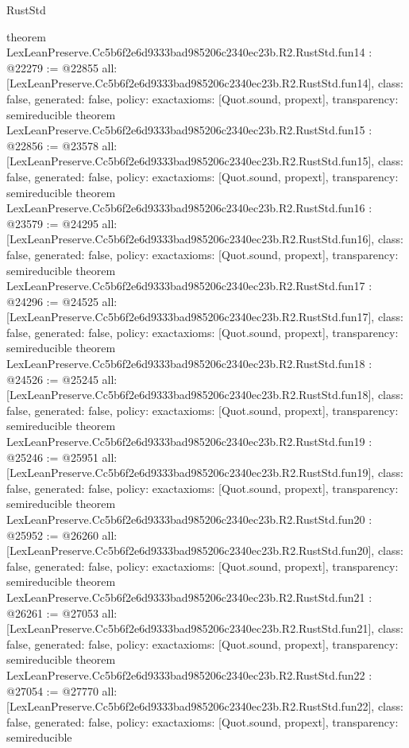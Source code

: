 \begin{lexlean}{RustStd}
\begin{coremodule}
{}
theorem LexLeanPreserve.Cc5b6f2e6d9333bad985206c2340ec23b.R2.RustStd.fun14 : @22279 := @22855 {
  all: [LexLeanPreserve.Cc5b6f2e6d9333bad985206c2340ec23b.R2.RustStd.fun14],
  class: false,
  generated: false,
  policy: exact{axioms: [Quot.sound, propext]},
  transparency: semireducible
}
theorem LexLeanPreserve.Cc5b6f2e6d9333bad985206c2340ec23b.R2.RustStd.fun15 : @22856 := @23578 {
  all: [LexLeanPreserve.Cc5b6f2e6d9333bad985206c2340ec23b.R2.RustStd.fun15],
  class: false,
  generated: false,
  policy: exact{axioms: [Quot.sound, propext]},
  transparency: semireducible
}
theorem LexLeanPreserve.Cc5b6f2e6d9333bad985206c2340ec23b.R2.RustStd.fun16 : @23579 := @24295 {
  all: [LexLeanPreserve.Cc5b6f2e6d9333bad985206c2340ec23b.R2.RustStd.fun16],
  class: false,
  generated: false,
  policy: exact{axioms: [Quot.sound, propext]},
  transparency: semireducible
}
theorem LexLeanPreserve.Cc5b6f2e6d9333bad985206c2340ec23b.R2.RustStd.fun17 : @24296 := @24525 {
  all: [LexLeanPreserve.Cc5b6f2e6d9333bad985206c2340ec23b.R2.RustStd.fun17],
  class: false,
  generated: false,
  policy: exact{axioms: [Quot.sound, propext]},
  transparency: semireducible
}
theorem LexLeanPreserve.Cc5b6f2e6d9333bad985206c2340ec23b.R2.RustStd.fun18 : @24526 := @25245 {
  all: [LexLeanPreserve.Cc5b6f2e6d9333bad985206c2340ec23b.R2.RustStd.fun18],
  class: false,
  generated: false,
  policy: exact{axioms: [Quot.sound, propext]},
  transparency: semireducible
}
theorem LexLeanPreserve.Cc5b6f2e6d9333bad985206c2340ec23b.R2.RustStd.fun19 : @25246 := @25951 {
  all: [LexLeanPreserve.Cc5b6f2e6d9333bad985206c2340ec23b.R2.RustStd.fun19],
  class: false,
  generated: false,
  policy: exact{axioms: [Quot.sound, propext]},
  transparency: semireducible
}
theorem LexLeanPreserve.Cc5b6f2e6d9333bad985206c2340ec23b.R2.RustStd.fun20 : @25952 := @26260 {
  all: [LexLeanPreserve.Cc5b6f2e6d9333bad985206c2340ec23b.R2.RustStd.fun20],
  class: false,
  generated: false,
  policy: exact{axioms: [Quot.sound, propext]},
  transparency: semireducible
}
theorem LexLeanPreserve.Cc5b6f2e6d9333bad985206c2340ec23b.R2.RustStd.fun21 : @26261 := @27053 {
  all: [LexLeanPreserve.Cc5b6f2e6d9333bad985206c2340ec23b.R2.RustStd.fun21],
  class: false,
  generated: false,
  policy: exact{axioms: [Quot.sound, propext]},
  transparency: semireducible
}
theorem LexLeanPreserve.Cc5b6f2e6d9333bad985206c2340ec23b.R2.RustStd.fun22 : @27054 := @27770 {
  all: [LexLeanPreserve.Cc5b6f2e6d9333bad985206c2340ec23b.R2.RustStd.fun22],
  class: false,
  generated: false,
  policy: exact{axioms: [Quot.sound, propext]},
  transparency: semireducible
}
\end{coremodule}
\end{lexlean}
